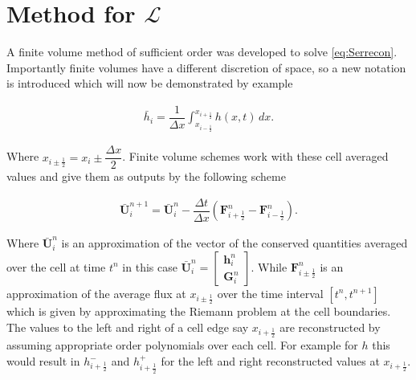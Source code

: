 \documentclass[SingleSpace,12pt]{Serre_ASCE}
\begin{document}
\section{Method for $\mathcal{L}$}
A finite volume method of sufficient order was developed to solve \eqref{eq:Serrecon}. Importantly finite volumes have a different discretion of space, so a new notation is introduced which will now be demonstrated by example
\begin{linenomath*}
\begin{gather*}
\bar{h}_i = \dfrac{1}{\Delta x} \int_{x_{i-\frac{1}{2}}}^{x_{i+\frac{1}{2}}} h(x,t) \, dx .
\end{gather*}
\end{linenomath*}
Where $x_{i \pm \frac{1}{2}} = x_i \pm \dfrac{\Delta x}{2}$. Finite volume schemes work with these cell averaged values and give them  as outputs by the following scheme
\begin{linenomath*}
\begin{gather*}
\boldsymbol{\bar{U}}^{n+1}_i = \boldsymbol{\bar{U}}^{n}_i - \dfrac{\Delta t}{\Delta x} \left(\boldsymbol{F}^n_{i+ \frac{1}{2}} - \boldsymbol{F}^n_{i - \frac{1}{2}} \right).
\end{gather*}
\end{linenomath*}
Where $\boldsymbol{\bar{U}}^{n}_i$ is an approximation of the vector of the conserved quantities averaged over the cell at time $t^n$ in this case $\boldsymbol{\bar{U}}^{n}_i = \left[\begin{array}{c}
 \boldsymbol{h}^{n}_i \\
 \boldsymbol{G}^{n}_i
 \end{array}\right] $. While $\boldsymbol{F}^n_{i\pm \frac{1}{2}}$ is an approximation of the average flux at $x_{i \pm \frac{1}{2} }$ over the time interval $\left[t^n, t^{n+1}\right]$ which is given by approximating the Riemann problem at the cell boundaries. The values to the left and right of a cell edge say $x_{i + \frac{1}{2}}$ are reconstructed by assuming appropriate order polynomials over each cell. For example for $h$ this would result in $h^-_{i + \frac{1}{2}}$ and $h^+_{i + \frac{1}{2}}$ for the left and right reconstructed values at $x_{i + \frac{1}{2} }$.
\end{document}

